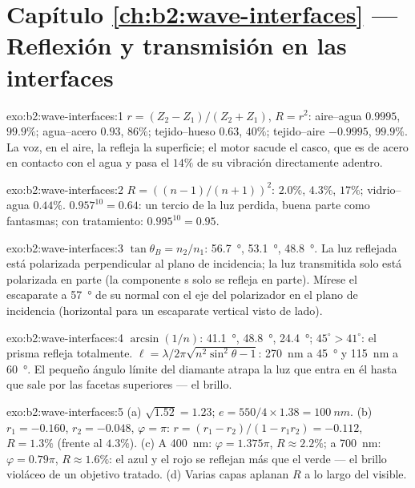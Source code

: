 \section*{Capítulo \ref{ch:b2:wave-interfaces} --- Reflexión y transmisión en las interfaces}

\begin{solution}{exo:b2:wave-interfaces:1}
$r = (Z_2 - Z_1)/(Z_2 + Z_1)$, $R = r^2$: aire--agua $0.9995$, $99.9\%$;
agua--acero $0.93$, $86\%$; tejido--hueso $0.63$, $40\%$; tejido--aire
$-0.9995$, $99.9\%$. La voz, en el aire, la refleja la superficie; el
motor sacude el casco, que es de acero en contacto con el agua y
pasa el $14\%$ de su vibración directamente adentro.
\end{solution}

\begin{solution}{exo:b2:wave-interfaces:2}
$R = ((n - 1)/(n + 1))^2$: $2.0\%$, $4.3\%$, $17\%$; vidrio--agua $0.44\%$.
$0.957^{10} = 0.64$: un tercio de la luz perdida, buena parte como fantasmas;
con tratamiento: $0.995^{10} = 0.95$.
\end{solution}

\begin{solution}{exo:b2:wave-interfaces:3}
$\tan\theta_B = n_2/n_1$: \qty{56.7}{\degree}, \qty{53.1}{\degree}, \qty{48.8}{\degree}. La
luz reflejada está polarizada perpendicular al plano de incidencia;
la luz transmitida solo está polarizada en parte (la componente s solo se
refleja en parte). Mírese el escaparate a \qty{57}{\degree} de su
normal con el eje del polarizador en el plano de incidencia (horizontal
para un escaparate vertical visto de lado).
\end{solution}

\begin{solution}{exo:b2:wave-interfaces:4}
$\arcsin(1/n)$: \qty{41.1}{\degree}, \qty{48.8}{\degree}, \qty{24.4}{\degree}; $45^\circ > 41^\circ$:
el prisma refleja totalmente. $\ell = \lambda/2\pi\sqrt{n^2\sin^2\theta - 1}$: \qty{270}{nm}
a \qty{45}{\degree} y \qty{115}{nm} a \qty{60}{\degree}. El pequeño ángulo límite del diamante
atrapa la luz que entra en él hasta que sale por las facetas superiores ---
el brillo.
\end{solution}

\begin{solution}{exo:b2:wave-interfaces:5}
(a) $\sqrt{1.52} = 1.23$; $e = 550/4 \times 1.38 = \qty{100}{nm}$. (b) $r_1 = -0.160$, $r_2 =
-0.048$, $\varphi = \pi$: $r = (r_1 - r_2)/(1 - r_1r_2) = -0.112$, $R = 1.3\%$ (frente al
$4.3\%$). (c) A \qty{400}{nm}: $\varphi = 1.375\pi$, $R \approx 2.2\%$; a \qty{700}{nm}: $\varphi =
0.79\pi$, $R \approx 1.6\%$: el azul y el rojo se reflejan más que el verde ---
el brillo violáceo de un objetivo tratado. (d) Varias capas aplanan $R$
a lo largo del visible.
\end{solution}

